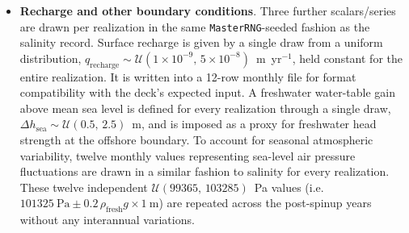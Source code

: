 \begin{itemize}
    \texttt{scipy.stats.uniform} draw per calendar month, from ranges based on realistic seasonal extrema. After converting to mol~NaCl~kg$^{-1}$ units, as expected by PFLOTRAN's transport constraints, the same twelve values are then tiled unchanged across every simulated year of the post-spinup simulation horizon. Thus, the seasonal cycle repeats identically year over year, with no interannual variability, and is written out as one \texttt{Sal <value> T} concentration constraint per output timestep.
  \item \textbf{Recharge and other boundary conditions}. Three further
    scalars/series are drawn per realization in the same
    \texttt{MasterRNG}-seeded fashion as the salinity record. Surface
    recharge is given by a single draw from a uniform distribution,
    $q_{\mathrm{recharge}}\sim\mathcal{U}(1\times10^{-9},\,5\times10^{-8})$~m~yr$^{-1}$, held constant for the entire realization. It is written into a 12-row monthly file for format compatibility with the deck's expected
    input. A freshwater water-table gain above mean sea level is defined for every realization through a single draw,
    $\Delta h_{\mathrm{sea}}\sim\mathcal{U}(0.5,\,2.5)$~m, and is imposed as a proxy for freshwater head strength at the offshore boundary. To account for seasonal atmospheric variability, twelve monthly values representing sea-level air pressure fluctuations are drawn in a similar fashion to salinity for every realization. These twelve independent
    $\mathcal{U}(99365,\,103285)$~Pa values (i.e.\ $101325~\mathrm{Pa}\pm
    0.2\,\rho_{\mathrm{fresh}} g \times 1~\mathrm{m}$) are repeated across the
    post-spinup years without any interannual variations.
\end{itemize}

